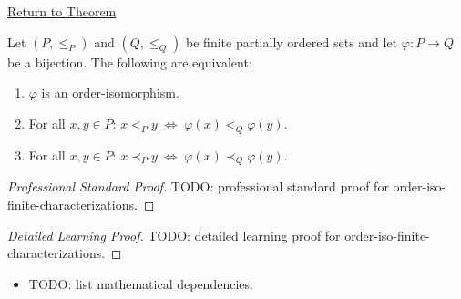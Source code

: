 \newpage
{}
\label{prf:order-iso-finite-characterizations}

\begin{remark*}[Return]
\hyperref[lem:order-iso-finite-characterizations]{Return to Theorem}
\end{remark*}

\begin{lemma*}
Let $(P, \leq_P)$ and $(Q, \leq_Q)$ be finite partially ordered sets and
let $\varphi : P \to Q$ be a bijection.  The following are equivalent:
\begin{enumerate}
  \item $\varphi$ is an order-isomorphism.
  \item For all $x, y \in P$:\; $x <_P y \;\Longleftrightarrow\; \varphi(x) <_Q \varphi(y)$.
  \item For all $x, y \in P$:\; $x \prec_P y \;\Longleftrightarrow\; \varphi(x) \prec_Q \varphi(y)$.
\end{enumerate}
\end{lemma*}

\begin{proof}[Professional Standard Proof]
\LRAProofBodyStart
TODO: professional standard proof for order-iso-finite-characterizations.
\end{proof}

\begin{proof}[Detailed Learning Proof]
\LRAProofBodyStart
TODO: detailed learning proof for order-iso-finite-characterizations.
\end{proof}

\begin{remark*}
\end{remark*}

\begin{dependencies}
\begin{itemize}
  \item TODO: list mathematical dependencies.
\end{itemize}
\end{dependencies}

\clearpage
